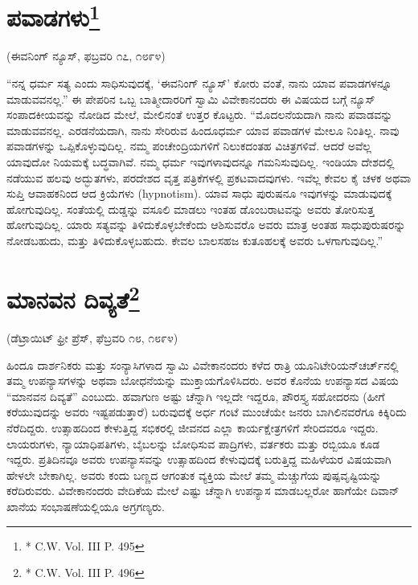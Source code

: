 \vskip -1cm

\delimiter


\section[ಪವಾಡಗಳು]{ಪವಾಡಗಳು\protect\footnote{* C.W. Vol. III P. 495}}

\begin{center}
(ಈವನಿಂಗ್​ ನ್ಯೂಸ್​, ಫಬ್ರವರಿ ೧೭, ೧೮೯೪)
\end{center}

\vskip -0.3cm

“ನನ್ನ ಧರ್ಮ ಸತ್ಯ ಎಂದು ಸಾಧಿಸುವುದಕ್ಕೆ, ‘ಈವನಿಂಗ್​ ನ್ಯೂಸ್​’ ಕೋರು ವಂತೆ, ನಾನು ಯಾವ ಪವಾಡಗಳನ್ನೂ ಮಾಡುವವನಲ್ಲ.” ಈ ಪೇಪರಿನ ಒಬ್ಬ ಬಾತ್ಮೀದಾರರಿಗೆ ಸ್ವಾಮಿ ವಿವೇಕಾನಂದರು ಈ ವಿಷಯದ ಬಗ್ಗೆ ನ್ಯೂಸ್​ ಸಂಪಾದಕೀಯವನ್ನು ನೋಡಿದ ಮೇಲೆ, ಮೇಲಿನಂತೆ ಉತ್ತರ ಕೊಟ್ಟರು. “ಮೊದಲನೆಯದಾಗಿ ನಾನು ಪವಾಡವನ್ನು ಮಾಡುವವನಲ್ಲ. ಎರಡನೆಯದಾಗಿ, ನಾನು ಸೇರಿರುವ ಹಿಂದೂಧರ್ಮ ಯಾವ ಪವಾಡಗಳ ಮೇಲೂ ನಿಂತಿಲ್ಲ. ನಾವು ಪವಾಡಗಳನ್ನು ಒಪ್ಪಿಕೊಳ್ಳುವುದಿಲ್ಲ. ನಮ್ಮ ಪಂಚೇಂದ್ರಿಯಗಳಿಗೆ ನಿಲುಕದಂತಹ ವಿಚಿತ್ರಗಳಿವೆ. ಆದರೆ ಅವೆಲ್ಲ ಯಾವುದೋ ನಿಯಮಕ್ಕೆ ಬದ್ಧವಾಗಿವೆ. ನಮ್ಮ ಧರ್ಮ ಇವುಗಳಾವುದನ್ನೂ ಗಮನಿಸುವುದಿಲ್ಲ. ಇಂಡಿಯಾ ದೇಶದಲ್ಲಿ ನಡೆಯುವ ಹಲವು ಅದ್ಭುತಗಳು, ಪರದೇಶದ ವೃತ್ತ ಪತ್ರಿಕೆಗಳಲ್ಲಿ ಪ್ರಕಟವಾದವುಗಳು. ಇವೆಲ್ಲ ಕೇವಲ ಕೈ ಚಳಕ ಅಥವಾ ಸುಪ್ತಿ ಆವಾಹಕನಿಂದ ಆದ ಕ್ರಿಯೆಗಳು (hypnotism). ಯಾವ ಸಾಧು ಪುರುಷನೂ ಇವುಗಳನ್ನು ಮಾಡುವುದಕ್ಕೆ ಹೋಗುವುದಿಲ್ಲ. ಸಂತೆಯಲ್ಲಿ ದುಡ್ಡನ್ನು ವಸೂಲಿ ಮಾಡಲು ಇಂತಹ ಡೊಂಬರಾಟವನ್ನು ಅವರು ತೋರಿಸುತ್ತ ಹೋಗುವುದಿಲ್ಲ. ಯಾರು ಸತ್ಯವನ್ನು ತಿಳಿದುಕೊಳ್ಳಬೇಕೆಂದು ಆಶಿಸುವರೊ ಅವರು ಮಾತ್ರ ಅಂತಹ ಸಾಧುಪುರುಷರನ್ನು ನೋಡಬಹುದು, ಮತ್ತು ತಿಳಿದುಕೊಳ್ಳಬಹುದು. ಕೇವಲ ಬಾಲಸಹಜ ಕುತೂಹಲಕ್ಕೆ ಅವರು ಒಳಗಾಗುವುದಿಲ್ಲ.”

\delimiter


\section[ಮಾನವನ ದಿವ್ಯತೆ]{ಮಾನವನ ದಿವ್ಯತೆ\protect\footnote{* C.W. Vol. III P. 496}}

\begin{center}
(ಡೆಟ್ರಾಯಿಟ್​ ಫ್ರೀ ಪ್ರೆಸ್​, ಫೆಬ್ರವರಿ ೧೮, ೧೮೯೪)
\end{center}

\vskip -0.4cm

ಹಿಂದೂ ದಾರ್ಶನಿಕರು ಮತ್ತು ಸಂನ್ಯಾಸಿಗಳಾದ ಸ್ವಾಮಿ ವಿವೇಕಾನಂದರು ಕಳೆದ ರಾತ್ರಿ ಯೂನಿಟೇರಿಯನ್​ ಚರ್ಚ್​ನಲ್ಲಿ ತಮ್ಮ ಉಪನ್ಯಾಸಗಳನ್ನು ಅಥವಾ ಬೋಧನೆಯನ್ನು ಮುಕ್ತಾಯಗೊಳಿಸಿದರು. ಅವರ ಕೊನೆಯ ಉಪನ್ಯಾಸದ ವಿಷಯ “ಮಾನವನ ದಿವ್ಯತೆ” ಎಂಬುದು. ಹವಾಗುಣ ಅಷ್ಟು ಚೆನ್ನಾಗಿ ಇಲ್ಲದೇ ಇದ್ದರೂ, ಪೌರಸ್ತ್ಯ ಸಹೋದರನು (ಹೀಗೆ ಕರೆಯುವುದನ್ನು ಅವರು ಇಷ್ಟಪಡುತ್ತಾರೆ) ಬರುವುದಕ್ಕೆ ಅರ್ಧ ಗಂಟೆ ಮುಂಚೆಯೇ ಜನರು ಬಾಗಿಲಿನವರೆಗೂ ಕಿಕ್ಕಿರಿದು ನೆರೆದಿದ್ದರು. ಉತ್ಸಾಹದಿಂದ ಕೇಳುತ್ತಿದ್ದ ಸಭಿಕರಲ್ಲಿ ಜೀವನದ ಎಲ್ಲಾ ಕಾರ್ಯಕ್ಷೇತ್ರಗಳಿಗೆ ಸೇರಿದವರೂ ಇದ್ದರು. ಲಾಯರುಗಳು, ನ್ಯಾಯಾಧಿಪತಿಗಳು, ಬೈಬಲನ್ನು ಬೋಧಿಸುವ ಪಾದ್ರಿಗಳು, ವರ್ತಕರು ಮತ್ತು ರಬ್ಬಿಯೂ ಕೂಡ ಇದ್ದರು. ಪ್ರತಿದಿನವೂ ಅವರು ಉಪನ್ಯಾಸವನ್ನು ಉತ್ಸಾಹದಿಂದ ಕೇಳುವುದಕ್ಕೆ ಬರುತ್ತಿದ್ದ ಮಹಿಳೆಯರ ವಿಷಯವಾಗಿ ಹೇಳಲೇ ಬೇಕಾಗಿಲ್ಲ. ಅವರು ಕಂದು ಬಣ್ಣದ ಆಗಂತುಕ ವ್ಯಕ್ತಿಯ ಮೇಲೆ ತಮ್ಮ ಮೆಚ್ಚುಗೆಯ ಪುಷ್ಪವೃಷ್ಟಿಯನ್ನು ಕರೆದಿರುವರು. ವಿವೇಕಾನಂದರು ವೇದಿಕೆಯ ಮೇಲೆ ಎಷ್ಟು ಚೆನ್ನಾಗಿ ಉಪನ್ಯಾಸ ಮಾಡಬಲ್ಲರೋ ಹಾಗೆಯೇ ದಿವಾನ್​ ಖಾನೆಯ ಸಂಭಾಷಣೆಯಲ್ಲಿಯೂ ಅಗ್ರಗಣ್ಯರು.

